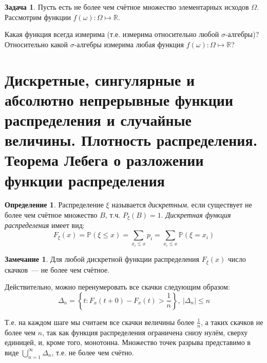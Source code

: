 \documentclass[oneside,final,14pt]{extreport}
\theoremstyle{plain}
\theoremstyle{definition}
\newtheorem*{defn}{Определение}
\newtheorem*{rmrk}{Замечание}
\newtheorem*{task}{Задача}
\theoremstyle{named}
\begin{document}
\begin{task}
Пусть есть не более чем счётное множество элементарных исходов $\Omega$. Рассмотрим функции ${f(\omega) \colon \Omega \mapsto \mathbb{R}}$.

Какая функция всегда измерима (т.е. измерима относительно любой ${\sigma \text{-алгебры}}$)? 
Относительно какой ${\sigma \text{-алгебры}}$ измерима любая функция ${f(\omega) \colon \Omega \mapsto \mathbb{R}}$?
\end{task}
 
\section{Дискретные, сингулярные и абсолютно непрерывные функции распределения и случайные величины. Плотность распределения. Теорема Лебега о разложении функции распределения}

\begin{defn}
    Распределение $\xi$ называется {\it дискретным}, если существует не более чем счётное множество $B$, т.ч. $P_\xi(B) = 1$. \textit{Дискретная функция распределения} имеет вид:
    \begin{equation*}
        F_\xi(x) = \mathbb{P}(\xi \leqslant x) = \sum\limits_{x_i \leqslant x}{}p_{i} = \sum\limits_{x_i \leqslant x}{}\mathbb{P}(\xi = x_{i})
    \end{equation*}
\end{defn}

\begin{rmrk}
    Для любой дискретной функции распределения $F_\xi(x)$ число скачков~--- не более чем счётное.
    
    Действительно, можно перенумеровать все скачки следующим образом:
    \begin{equation*}
        \Delta_{n}=\left\{t : F_{x}(t+0)-F_{x}(t)>\frac{1}{n}\right\},~ |\Delta_{n} | \leqslant n
    \end{equation*}
    
    Т.е. на каждом шаге мы считаем все скачки величины более $\frac{1}{n}$, а таких скачков не более чем $n$, так как функция распределения ограничена снизу нулём, сверху единицей, и, кроме того, монотонна.
    Множество точек разрыва представимо в виде $\bigcup\limits_{n = 1}^{\infty} \Delta_{n}$, т.е. не более чем счётно.
\end{rmrk}
\end{document}
